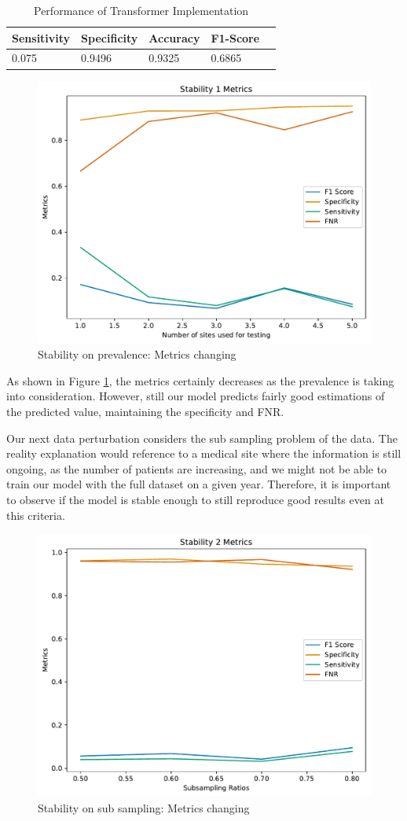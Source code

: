 \documentclass[10pt,letterpaper]{article}
\begin{document}
\begin{table}[H]
\centering
\footnotesize
\begin{tabular}{lllll}
\toprule
\textbf{Sensitivity} & \textbf{Specificity} & \textbf{Accuracy} &  \textbf{F1-Score}\\
\midrule
0.075 & 0.9496 & 0.9325 & 0.6865  \\
\bottomrule
\end{tabular}
\caption{Performance of Transformer Implementation}%
\end{table}

\begin{figure}[H]
    \centering
    \includegraphics[width=0.5\linewidth]{plots/tabpfn_stability1_metrics.pdf}
    \caption{Stability on prevalence: Metrics changing}
    \label{fig:stab-1}
\end{figure}

As shown in Figure \ref{fig:stab-1}, the metrics certainly decreases as the prevalence is taking into consideration. However, still our model predicts fairly good estimations of the predicted value, maintaining the specificity and FNR.

Our next data perturbation considers the sub sampling problem of the data. The reality explanation would reference to a medical site where the information is still ongoing, as the number of patients are increasing, and we might not be able to train our model with the full dataset on a given year. Therefore, it is important to observe if the model is stable enough to still reproduce good results even at this criteria. 

\begin{figure}[H]
    \centering
    \includegraphics[width=0.5\linewidth]{plots/tabpfn_stability2_metrics.pdf}
    \caption{Stability on sub sampling: Metrics changing}
    \label{fig:enter-label}
\end{figure}
\end{document}
